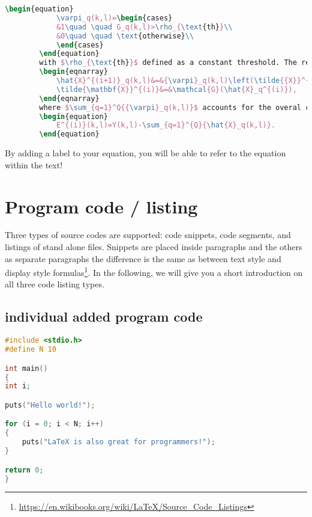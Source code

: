 	\begin{mdframed}
		\begin{lstlisting}[language = TeX, caption={The math example}]
		\begin{equation}
			\varpi_q(k,l)=\begin{cases}
			&1\quad \quad G_q(k,l)>\rho_{\text{th}}\\
			&0\quad \quad \text{otherwise}\\
			\end{cases}
		\end{equation}
		with $\rho_{\text{th}}$ defined as a constant threshold. The remixing error spreading is performed as follows:
		\begin{eqnarray}
			\hat{X}^{(i+1)}_q(k,l)&=&{\varpi}_q(k,l)\left(\tilde{{X}}^{(i)}_q(k,l)+\frac{E^{(i)}(k,l)}{\sum_{q=1}^Q{{\varpi}_q(k,l)}}\right)\nonumber\\
			\tilde{\mathbf{X}}^{(i)}&=&\mathcal{G}(\hat{X}_q^{(i)}),
		\end{eqnarray}
		where $\sum_{q=1}^Q{{\varpi}_q(k,l)}$ accounts for the overal contributions of sources in time frequency error distribution and the remixing error $E^{(i)}(k,l)$ is defined as 
		\begin{equation}
			E^{(i)}(k,l)=Y(k,l)-\sum_{q=1}^{Q}{\hat{X}_q(k,l)}.
		\end{equation}
		\end{lstlisting}
		By adding a label to your equation, you will be able to refer to the equation within the text!
	\end{mdframed}

\section{Program code / listing}
Three types of source codes are supported: code snippets, code segments, and
listings of stand alone files. Snippets are placed inside paragraphs and the others as
separate paragraphs the difference is the same as between text style and display
style formulas\footnote{\url{https://en.wikibooks.org/wiki/LaTeX/Source_Code_Listings}}. In the following, we will give you a short introduction on all three code listing types.

\subsection{individual added program code}
\begin{lstlisting}[language = C,caption = {Single code}]
#include <stdio.h>
#define N 10

int main()
{
int i;

puts("Hello world!");

for (i = 0; i < N; i++)
{
	puts("LaTeX is also great for programmers!");
}

return 0;
}
\end{lstlisting}

